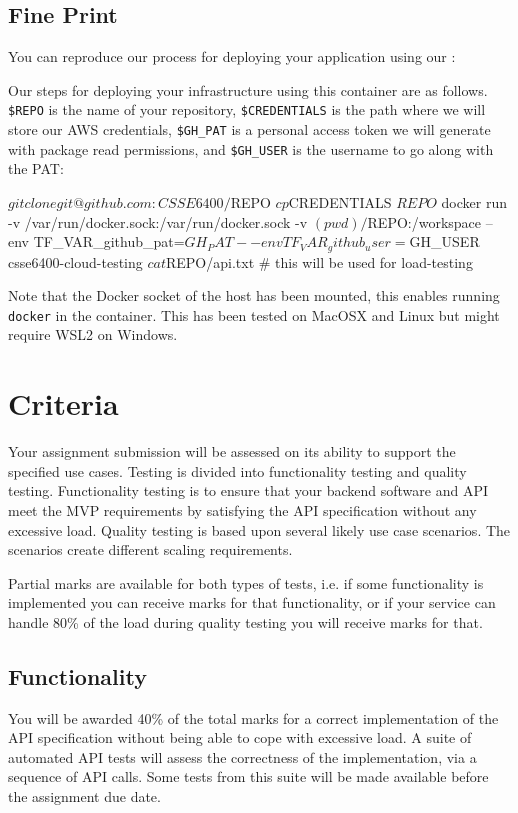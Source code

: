 \documentclass{csse4400}
\begin{document}
\subsection{Fine Print}
You can reproduce our process for deploying your application using our :

Our steps for deploying your infrastructure using this container are as follows.
\texttt{\$REPO} is the name of your repository,
\texttt{\$CREDENTIALS} is the path where we will store our AWS credentials,
\texttt{\$GH\_PAT} is a personal access token we will generate with package read permissions,
and \texttt{\$GH\_USER} is the username to go along with the PAT:
\begin{code}[language=shell]{}
$ git clone git@github.com:CSSE6400/$REPO
$ cp $CREDENTIALS $REPO
$ docker run -v /var/run/docker.sock:/var/run/docker.sock -v $(pwd)/$REPO:/workspace --env TF_VAR_github_pat=$GH_PAT --env TF_VAR_github_user=$GH_USER csse6400-cloud-testing
$ cat $REPO/api.txt # this will be used for load-testing
\end{code}

\noindent
Note that the Docker socket of the host has been mounted,
this enables running \texttt{docker} in the container.
This has been tested on MacOSX and Linux but might require WSL2 on Windows.


\section{Criteria}
Your assignment submission will be assessed on its ability to support the specified use cases.
Testing is divided into functionality testing and quality testing.
Functionality testing is to ensure that your backend software and API meet the MVP requirements by satisfying the API specification without any excessive load.
Quality testing is based upon several likely use case scenarios.
The scenarios create different scaling requirements.

Partial marks are available for both types of tests,
i.e. if some functionality is implemented you can receive marks for that functionality,
or if your service can handle 80\% of the load during quality testing you will receive marks for that.

\subsection{Functionality}
You will be awarded 40\% of the total marks for a correct implementation of the API specification without being able to cope with excessive load.
A suite of automated API tests will assess the correctness of the implementation, via a sequence of API calls.
Some tests from this suite will be made available before the assignment due date.
\end{document}
